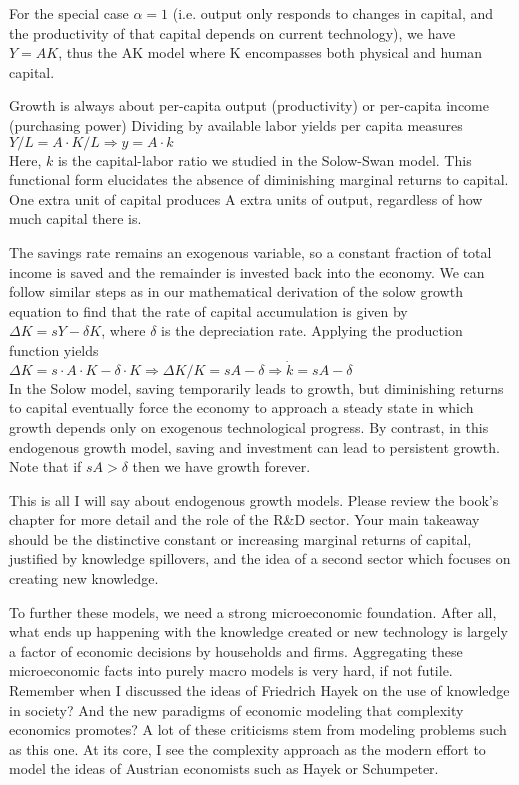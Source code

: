 \documentclass[10pt]{article}
\begin{document}
For the special case $\alpha=1$ (i.e. output only responds to changes in capital, and the productivity of that capital depends on current technology), we have\\
$Y=A K$, thus the AK model where K encompasses both physical and human capital.

Growth is always about per-capita output (productivity) or per-capita income (purchasing power) Dividing by available labor yields per capita measures\\
$Y / L=A \cdot K / L \Rightarrow y=A \cdot k$\\
Here, $k$ is the capital-labor ratio we studied in the Solow-Swan model. This functional form elucidates the absence of diminishing marginal returns to capital. One extra unit of capital produces A extra units of output, regardless of how much capital there is.

The savings rate remains an exogenous variable, so a constant fraction of total income is saved and the remainder is invested back into the economy. We can follow similar steps as in our mathematical derivation of the solow growth equation to find that the rate of capital accumulation is given by\\
$\Delta K=s Y-\delta K$, where $\delta$ is the depreciation rate. Applying the production function yields\\
$\Delta K=s \cdot A \cdot K-\delta \cdot K \Rightarrow \Delta K / K=s A-\delta \Rightarrow \dot{k}=s A-\delta$\\
In the Solow model, saving temporarily leads to growth, but diminishing returns to capital eventually force the economy to approach a steady state in which growth depends only on exogenous technological progress. By contrast, in this endogenous growth model, saving and investment can lead to persistent growth. Note that if $s A>\delta$ then we have growth forever.

This is all I will say about endogenous growth models. Please review the book's chapter for more detail and the role of the R\&D sector. Your main takeaway should be the distinctive constant or increasing marginal returns of capital, justified by knowledge spillovers, and the idea of a second sector which focuses on creating new knowledge.

To further these models, we need a strong microeconomic foundation. After all, what ends up happening with the knowledge created or new technology is largely a factor of economic decisions by households and firms. Aggregating these microeconomic facts into purely macro models is very hard, if not futile. Remember when I discussed the ideas of Friedrich Hayek on the use of knowledge in society? And the new paradigms of economic modeling that complexity economics promotes? A lot of these criticisms stem from modeling problems such as this one. At its core, I see the complexity approach as the modern effort to model the ideas of Austrian economists such as Hayek or Schumpeter.
\end{document}
